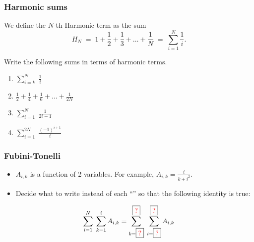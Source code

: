 \documentclass[14pt]{beamer}
\begin{document}
\begin{frame}[t]
	\fontsize{13}{13}\selectfont
	\frametitle{Harmonic sums}

	We define the $N$-th Harmonic term as the sum
	\[
		H_{N}\; = \; 1 + \frac{1}{2}+ \frac{1}{3}+ \ldots + \frac{1}{N}\; = \; \sum_{i=1}
		^{N}\frac{1}{i}.
	\]

	Write the following sums in terms of harmonic terms.

	\begin{multicols}{2}
		\begin{enumerate}
			\item $\displaystyle \sum_{i=k}^{N}\; \frac{1}{i}$

			\item $\displaystyle \frac{1}{2}+ \frac{1}{4}+ \frac{1}{6}+ \ldots + \frac{1}{2N}$

			\item $\displaystyle \sum_{i=1}^{N}\; \frac{1}{2i-1}$

			\item $\displaystyle \sum_{i=1}^{2N}\; \frac{(-1)^{i+1}}{i}$
		\end{enumerate}
	\end{multicols}
\end{frame}

\begin{frame}[t]
	\fontsize{13}{13}\selectfont
	\frametitle{Fubini-Tonelli}

	\begin{itemize}
		\item $A_{i,k}$ is a function of 2 variables. \; For example, $\displaystyle
			A_{i,k}= \frac{i}{k+i^{2}}$.

		\item Decide what to write instead of each ``''
			so that the following identity is true:
	\end{itemize}

	{\fontsize{20}{20}\selectfont \begin{equation*}\sum_{i=1}^{N}\; \sum_{k=1}^{i}A_{i, k}= \sum_{k = \boxed{{\color{red} ?}}}^{\boxed{{\color{red} ?}}}\; \sum_{i=\boxed{{\color{red} ?}}}^{\boxed{{\color{red} ?}}}A_{i,k}\end{equation*} }
\end{frame}
\end{document}
